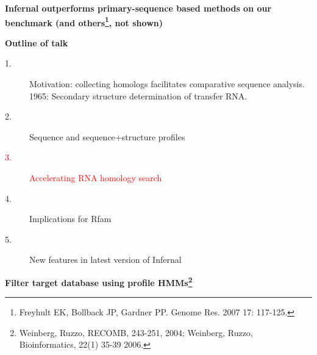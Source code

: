 \documentclass[landscape]{slides}
\begin{document}
\begin{slide}
\begin{slide}
\begin{center}
\textbf{Infernal outperforms primary-sequence based methods on our
  benchmark (and others\footnote{Freyhult EK, Bollback JP, Gardner
    PP. Genome Res. 2007 17: 117-125.}, not shown)}

\end{center}
\medskip


\vfill 
\end{slide}
\begin{slide}
\begin{center}
\textbf{Outline of talk}

\begin{description}
\item[1.] Motivation: collecting homologs facilitates comparative
  sequence analysis.\\ 1965: Secondary structure determination of
  transfer RNA.
\item[2.] Sequence and sequence+structure profiles
\item[\textcolor{red}{3.}] \textcolor{red}{Accelerating RNA homology search}
\item[4.] Implications for Rfam
\item[5.] New features in latest version of Infernal
\end{description}

\end{center}
\vfill
\end{slide}
\begin{slide}
\begin{center}
\large
\textbf{Filter target database using profile HMMs\footnote{Weinberg,
    Ruzzo, RECOMB, 243-251, 2004; Weinberg, Ruzzo, Bioinformatics,
    22(1) 35-39 2006.}}
\end{center}


\end{slide}
\end{slide}
\end{document}
